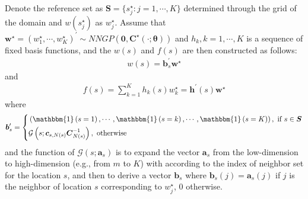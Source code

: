 \documentclass[
12pt, %
a4paper, %
oneside, %
headinclude,footinclude, %
BCOR5mm, %
]{scrartcl}
\begin{document}
\begin{itemize}
Denote the reference set as $\boldsymbol{S} = \{s_j^{\star}: j = 1, \cdots, K\}$ determined through the grid of the domain and $w(s_j^{\star})$ as $w^{\star}_j$. Assume that $\boldsymbol{w}^{\star} = \left(w_1^{\star}, \cdots, w_K^{\star}\right)^\prime \sim NNGP\left(\boldsymbol{0}, \boldsymbol{{C}^{\star}}(\cdot; \boldsymbol{\theta})\right)$ and $h_{k}, k = 1, \cdots, K$ is a sequence of fixed basis functions, and the $w(s)$ and $f(s)$ are then constructed as follows:
\begin{equation}
\begin{aligned}
w(s) = \boldsymbol{b}^\prime_s \boldsymbol{w}^{\star} \label{Sm1}
\end{aligned}
\end{equation}
and
\begin{equation}
\begin{aligned}
f(s) = \sum_{k = 1}^{K}h_{k}(s)w_{k}^{\star} = \boldsymbol{h}^\prime(s) \boldsymbol{w}^{\star}\label{Sm2}
\end{aligned}
\end{equation}
where
\begin{equation}
\boldsymbol{b}^\prime_s = \left\{
\begin{aligned}
&\left(\mathbbm{1}\left(s = 1\right), \cdots, \mathbbm{1}\left(s = k\right), \cdots, \mathbbm{1}\left(s = K\right) \right), \text{ if } s \in \boldsymbol{S}\\ &
\mathcal{G}\left(s; \boldsymbol{c}_{s, N(s)} \boldsymbol{C}_{N(s)}^{-1}\right), \text{ otherwise }
\end{aligned}
\right.\label{Sm3}
\end{equation}
and the function of $\mathcal{G}(s; \boldsymbol{a}_s)$ is to expand the vector $\boldsymbol{a}_s$ from the low-dimension to high-dimension (e.g., from $m$ to $K$) with  according to the index of neighbor set for the location $s$, and then to derive a vector $\boldsymbol{b}_s$ where $\boldsymbol{b}_s(j) = \boldsymbol{a}_s(j)$ if $j$ is the neighbor of location $s$ corresponding to $w_j^{\star}$, 0 otherwise.


\end{itemize}
\end{document}
